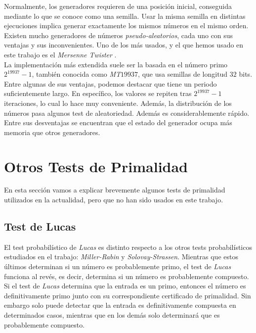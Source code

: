 Normalmente, los generadores requieren de una posición inicial, conseguida mediante lo que se conoce como una semilla. Usar la misma semilla en distintas ejecuciones implica generar exactamente los mismos números en el mismo orden.\\

Existen mucho generadores de números \textit{pseudo-aleatorios}, cada uno con sus ventajas y sus inconvenientes. Uno de los más usados, y el que hemos usado en este trabajo es el \textit{Mersenne Twister} \cite{matsumoto_nishimura_1998}.\\

La implementación más extendida suele ser la basada en el número primo $2^{19937}-1$, también conocida como \textit{MT$19937$}, que usa semillas de longitud $32$ bits. Entre algunas de sus ventajas, podemos destacar que tiene un periodo suficientemente largo. En específico, los valores se repiten tras $2^{19937}-1$ iteraciones, lo cual lo hace muy conveniente. Además, la distribución de los números pasa algunos test de aleatoriedad. Además es considerablemente rápido.\\

Entre sus desventajas se encuentran que el estado del generador ocupa más memoria que otros generadores.

\section{Otros Tests de Primalidad}

En esta sección vamos a explicar brevemente algunos tests de primalidad utilizados en la actualidad, pero que no han sido usados en este trabajo.

\subsection{Test de Lucas}

El test probabilístico de \textit{Lucas} es distinto respecto a los otros tests probabilísticos estudiados en el trabajo: \textit{Miller-Rabin} y \textit{Solovay-Strassen}. Mientras que estos últimos determinan si un número es probablemente primo, el test de \textit{Lucas} funciona al revés, es decir, determina si un número es probablemente compuesto.\\

Si el test de \textit{Lucas} determina que la entrada es un primo, entonces el número es definitivamente primo junto con su correspondiente certificado de primalidad. Sin embargo solo puede detectar que la entrada es definitivamente compuesta en determinados casos, mientras que en los demás solo determinará que es probablemente compuesto.\\

